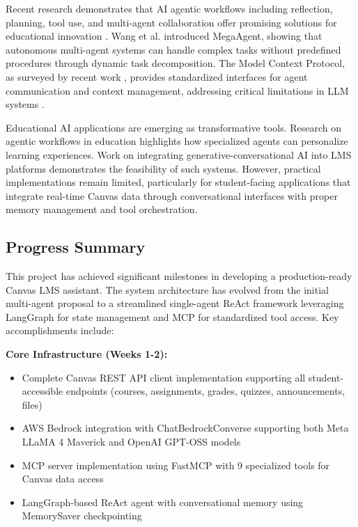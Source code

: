 \documentclass{article}
\begin{document}
Recent research demonstrates that AI agentic workflows including reflection, planning, tool use, and multi-agent collaboration offer promising solutions for educational innovation \cite{education2025agentic}. Wang et al. \cite{wang2025megaagent} introduced MegaAgent, showing that autonomous multi-agent systems can handle complex tasks without predefined procedures through dynamic task decomposition. The Model Context Protocol, as surveyed by recent work \cite{mcp2025landscape, mcp2025survey}, provides standardized interfaces for agent communication and context management, addressing critical limitations in LLM systems \cite{mcpenhance2025}.

Educational AI applications are emerging as transformative tools. Research on agentic workflows in education \cite{education2025agentic} highlights how specialized agents can personalize learning experiences. Work on integrating generative-conversational AI into LMS platforms \cite{lms2025ai} demonstrates the feasibility of such systems. However, practical implementations remain limited, particularly for student-facing applications that integrate real-time Canvas data through conversational interfaces with proper memory management and tool orchestration.

\subsection{Progress Summary}

This project has achieved significant milestones in developing a production-ready Canvas LMS assistant. The system architecture has evolved from the initial multi-agent proposal to a streamlined single-agent ReAct framework leveraging LangGraph for state management and MCP for standardized tool access. Key accomplishments include:

\textbf{Core Infrastructure (Weeks 1-2):}
\begin{itemize}
    \item Complete Canvas REST API client implementation supporting all student-accessible endpoints (courses, assignments, grades, quizzes, announcements, files)
    \item AWS Bedrock integration with ChatBedrockConverse supporting both Meta LLaMA 4 Maverick and OpenAI GPT-OSS models
    \item MCP server implementation using FastMCP with 9 specialized tools for Canvas data access
    \item LangGraph-based ReAct agent with conversational memory using MemorySaver checkpointing
\end{itemize}
\end{document}
